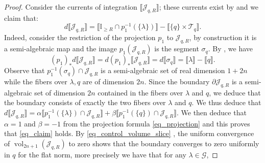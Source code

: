 \documentclass[12pt]{amsbook}%
\theoremstyle{definition}
\theoremstyle{remark}
\numberwithin{section}{chapter}
\numberwithin{subsection}{section}
\numberwithin{figure}{chapter}
\DeclareMathOperator{\vol}{vol}
\DeclareMathOperator{\R}{\mathbb{R}}
\newcommand\intcur[1]{\llbracket #1 \rrbracket}
\begin{document}
{{\begin{proof}
  Consider the currents of integration $\intcur{\mathcal{J}_{q,R}}$; these currents exist by \cite[\S~3 p.11]{hartd_cie} and we claim that: 
  \begin{equation} \label{eq_claim}
  	d \intcur{\mathcal{J}_{q,R}} = \intcur{\mathbb{I}_{\geqslant  R} \cap p_1^{-1}(\{\lambda\})} - \intcur{\{q \}\times \mathcal{T}_q}.
  \end{equation} 
   Indeed, consider the restriction of the projection $p_1$ to $\mathcal{J}_{q,R}$, by construction it is a semi-algebraic map and the image $p_1(\mathcal{J}_{q,R})$ is the segment $\sigma_q $.
   By \cite[Theorem 3.5]{hartd_cie}, we have 
   \begin{equation} \label{eq_projection}
   (p_1)_* d  \intcur{\mathcal{J}_{q,R}} = d (p_1)_*\intcur{\mathcal{J}_{q,R}} = d \intcur{\sigma_q} = \intcur{\lambda} - \intcur{q}.
   \end{equation}
   Observe that  $p_1^{-1}(\sigma_q) \cap \mathcal{J}_{q,R}$ is a semi-algebraic set of real dimension $1 + 2n $ while the fibers over $\lambda,q$ are of dimension $2n$. 
   Since the boundary  $\partial \mathcal{J}_{q,R}$ is a semi-algebraic set of dimension $2n$ contained in the fibers over $\lambda$ and $q$, we deduce that the boundary consists of exactly the two fibers over $\lambda$ and $q$. 
   We thus deduce that $d \intcur{\mathcal{J}_{q,R}} = \alpha \intcur{p_1^{-1}(\{\lambda \})\cap \mathcal{J}_{q,R}} + \beta\intcur{p_1^{-1}(\{q \})\cap \mathcal{J}_{q,R}} $. 
   We then deduce that $\alpha =1$ and $\beta =-1$ from the projection formula \eqref{eq_projection} and  this proves that \eqref{eq_claim} holds.  
By \eqref{eq_control_volume_slice} , the uniform convergence of $\vol_{2n+1} (\mathcal{J}_{q,R})$ to zero shows that the boundary converges to zero uniformly in $q$ for the flat norm, more precisely we have that for any $\lambda \in \mathcal{G}$, 

\end{proof}}}
\end{document}
